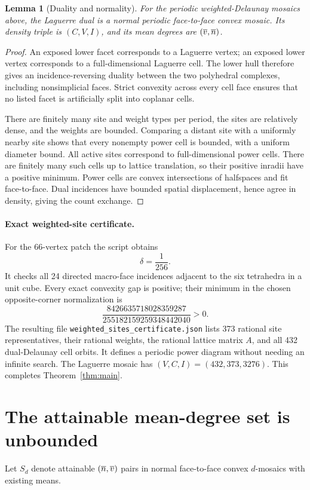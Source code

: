 \documentclass[11pt,a4paper]{article}
\newtheorem{lemma}[theorem]{Lemma}
\theoremstyle{definition}\newtheorem{definition}[theorem]{Definition}
\theoremstyle{remark}\newtheorem{remark}[theorem]{Remark}
\begin{document}
\begin{lemma}[Duality and normality]\label{lem:dual}
For the periodic weighted-Delaunay mosaics above, the Laguerre dual is a normal periodic face-to-face convex mosaic. Its density triple is \((C,V,I)\), and its mean degrees are \((\overline v,\overline n)\).
\end{lemma}
\begin{proof}
An exposed lower facet corresponds to a Laguerre vertex; an exposed lower vertex corresponds to a full-dimensional Laguerre cell. The lower hull therefore gives an incidence-reversing duality between the two polyhedral complexes, including nonsimplicial faces. Strict convexity across every cell face ensures that no listed facet is artificially split into coplanar cells.

There are finitely many site and weight types per period, the sites are relatively dense, and the weights are bounded. Comparing a distant site with a uniformly nearby site shows that every nonempty power cell is bounded, with a uniform diameter bound. All active sites correspond to full-dimensional power cells. There are finitely many such cells up to lattice translation, so their positive inradii have a positive minimum. Power cells are convex intersections of halfspaces and fit face-to-face. Dual incidences have bounded spatial displacement, hence agree in density, giving the count exchange.
\end{proof}

\paragraph{Exact weighted-site certificate.}
For the 66-vertex patch the script  obtains
\[
 \delta=\frac1{256}.
\]
It checks all 24 directed macro-face incidences adjacent to the six tetrahedra in a unit cube. Every exact convexity gap is positive; their minimum in the chosen opposite-corner normalization is
\[
 \frac{8426635718028359287}{255182159259348442040}>0.
\]
The resulting file \texttt{weighted\_sites\_certificate.json} lists 373 rational site representatives, their rational weights, the rational lattice matrix \(A\), and all 432 dual-Delaunay cell orbits. It defines a periodic power diagram without needing an infinite search. The Laguerre mosaic has \((V,C,I)=(432,373,3276)\). This completes Theorem~\ref{thm:main}.

\section{The attainable mean-degree set is unbounded}\label{sec:degrees}
Let \(S_d\) denote attainable \((\overline n,\overline v)\) pairs in normal face-to-face convex \(d\)-mosaics with existing means.
\end{document}
